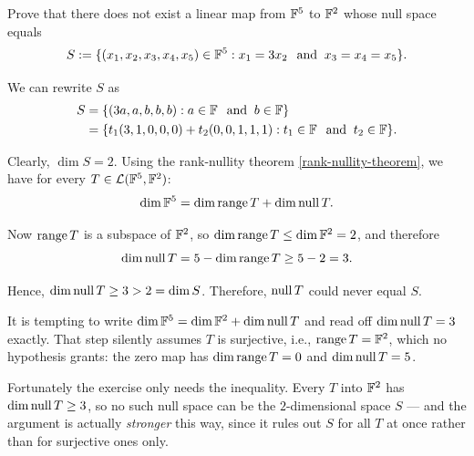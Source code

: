 \begin{xrcs}
  Prove that there does not exist a linear map from $\mathbb{F}^5$ to  $\mathbb{F}^2$ whose null space equals
  \begin{equation}
    S := \{(x_1, x_2, x_3, x_4, x_5) \in \mathbb{F}^5 : x_1 = 3 x_2 \;\;\, \text{and}\;\; x_3 = x_4 = x_5 \}.
  \end{equation}

  \begin{xprf}
    We can rewrite $S$ as
    \begin{equation}
      \begin{aligned}
        S &= \{ ( 3a, a, b,b,b) : a \in \mathbb{F} \;\;\, \text{and}\;\; b \in \mathbb{F} \} \\
          &= \{ t_1 (3,1,0,0,0) + t_2 (0,0,1,1,1) :  t_1 \in \mathbb{F} \;\;\, \text{and}\;\; t_2 \in \mathbb{F} \}.
      \end{aligned}
    \end{equation}

    Clearly, $\dim S = 2$. Using the rank-nullity theorem \ref{rank-nullity-theorem}, we have for every $T \in \mathcal{L} (\mathbb{F}^5, \mathbb{F}^2)$:
    \begin{equation}
      \dim \mathbb{F}^5 = \dim \operatorname{range} T + \dim \operatorname{null} T.
    \end{equation}

    Now $\operatorname{range} T$ is a subspace of $\mathbb{F}^2$, so $\dim \operatorname{range} T \leq \dim \mathbb{F}^2 = 2$, and therefore
    \begin{equation}
      \dim \operatorname{null} T = 5 - \dim \operatorname{range} T \geq 5 - 2 = 3.
    \end{equation}

    Hence, $\dim \operatorname{null} T \geq 3 > 2 = \dim S$. Therefore, $\operatorname{null} T$ could never equal $S$.
  \end{xprf}
\end{xrcs}

\begin{ainote}
  It is tempting to write $\dim \mathbb{F}^5 = \dim \mathbb{F}^2 + \dim \operatorname{null} T$ and read off $\dim \operatorname{null} T = 3$ exactly. That step silently assumes $T$ is surjective, i.e., $\operatorname{range} T = \mathbb{F}^2$, which no hypothesis grants: the zero map has $\dim \operatorname{range} T = 0$ and $\dim \operatorname{null} T = 5$.

  Fortunately the exercise only needs the inequality. Every $T$ into $\mathbb{F}^2$ has $\dim \operatorname{null} T \geq 3$, so no such null space can be the $2$-dimensional space $S$ --- and the argument is actually \emph{stronger} this way, since it rules out $S$ for all $T$ at once rather than for surjective ones only.
\end{ainote}


